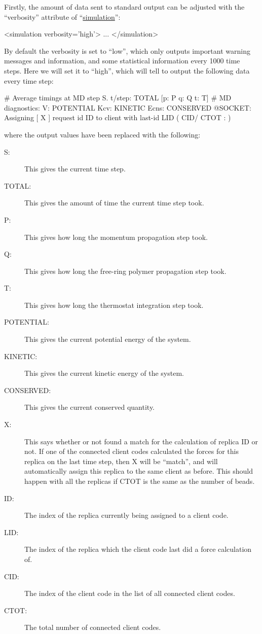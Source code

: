 \documentclass[11pt,english,fleqn]{report}
\newenvironment{code}{%
\footnotesize
\verbatim
}{
\endverbatim
\normalsize
}
\begin{document}
Firstly, the amount of data sent to standard output can be adjusted
with the {}``verbosity'' attribute of
{}``\hyperref[SIMULATION]{simulation}'':

\begin{code}
<simulation verbosity='high'>
   ...
</simulation>
\end{code}

By default the verbosity is set to {}``low'', which only outputs
important warning messages and information, and some statistical
information every 1000 time steps. Here we will set it to
{}``high'', which will
tell \ipi to output the following data every time step:

\begin{code}
 # Average timings at MD step S. t/step: TOTAL [p: P q: Q t: T]
 # MD diagnostics: V: POTENTIAL Kcv: KINETIC Ecns: CONSERVED
 @SOCKET: Assigning [ X ] request id ID to client with last-id LID ( CID/ CTOT : )
\end{code}
where the output values have been replaced with the following:
\begin{description}
\item [{S:}] This gives the current time step.
\item[{TOTAL:}] This gives the amount of time the current time step took.
\item [{P:}] This gives how long the momentum propagation step took.
\item [{Q:}] This gives how long the free-ring polymer propagation step took.
\item [{T:}] This gives how long the thermostat integration step took.
\item [{POTENTIAL:}] This gives the current potential energy of the system.
\item [{KINETIC:}] This gives the current kinetic energy of the system.
\item [{CONSERVED:}] This gives the current conserved quantity.
\item [{X:}] This says whether or not \ipi found a match for the calculation of
replica ID or not.
If one of the connected client codes calculated the forces for this replica on the
last time step, then X will be {}``match'', and \ipi will automatically assign
this replica to the same client as before. This should happen with all the replicas
if CTOT is the same as the number of beads.
\item [{ID:}] The index of the replica currently being assigned to a client code.
\item [{LID:}] The index of the replica which the client code last did a force calculation
of.
\item [{CID:}] The index of the client code in the list of all connected client codes.
\item [{CTOT:}] The total number of connected client codes.
\end{description}
\end{document}

